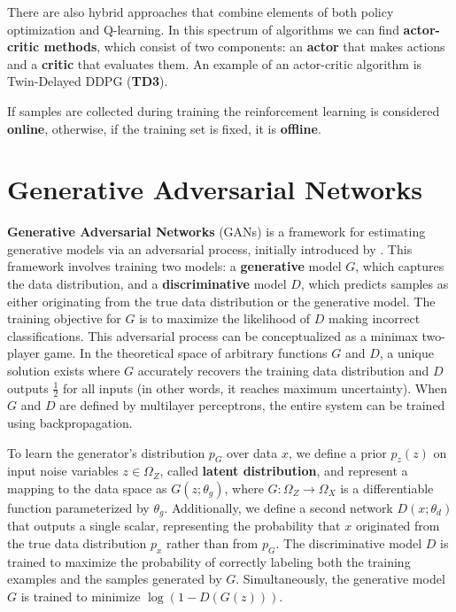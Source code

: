 There are also hybrid approaches that combine elements
of both policy optimization and Q-learning.
In this spectrum of algorithms we can find 
\textbf{actor-critic methods}, which consist of two components:
an \textbf{actor} that makes actions and a \textbf{critic} that evaluates them.
An example of an actor-critic algorithm is Twin-Delayed DDPG (\textbf{TD3}).

If samples are collected during training the reinforcement learning is
considered \textbf{online}, otherwise,
if the training set is fixed, it is \textbf{offline}.

\section{Generative Adversarial Networks}
\label{sec:gan}

\textbf{Generative Adversarial Networks} (GANs) is a framework
for estimating generative models via an adversarial process,
initially introduced by \cite{goodfellow2014}.
This framework involves training two models:
a \textbf{generative} model \( G \), which captures the data
distribution, and a \textbf{discriminative} model \( D \),
which predicts samples as either originating from the true
data distribution or the generative model.
The training objective for \( G \) is to maximize
the likelihood of \( D \) making incorrect classifications.
This adversarial process can be conceptualized as a minimax two-player game.
In the theoretical space of arbitrary functions \( G \) and \( D \),
a unique solution exists where \( G \) accurately
recovers the training data distribution and \( D \) outputs $\frac{1}{2}$
for all inputs (in other words, it reaches maximum uncertainty).
When \( G \) and \( D \) are defined by multilayer perceptrons,
the entire system can be trained using backpropagation.

To learn the generator's distribution \( p_G \)
over data \( x \), we define a prior \( p_z(z) \) on input noise variables
$z \in \Omega_Z$, called \textbf{latent distribution},
and represent a mapping to the data space as
\( G(z; \theta_g) \), where \( G: \Omega_Z \rightarrow \Omega_X \)
is a differentiable function parameterized by \( \theta_g \).
Additionally, we define a second network
\( D(x; \theta_d) \) that outputs a single scalar,
representing the probability that \( x \) originated
from the true data distribution $p_x$ rather than from \( p_G \).
The discriminative model \( D \) is trained to maximize
the probability of correctly labeling both the training
examples and the samples generated by \( G \).
Simultaneously, the generative model \( G \) is trained to minimize
\( \log(1 - D(G(z))) \).

